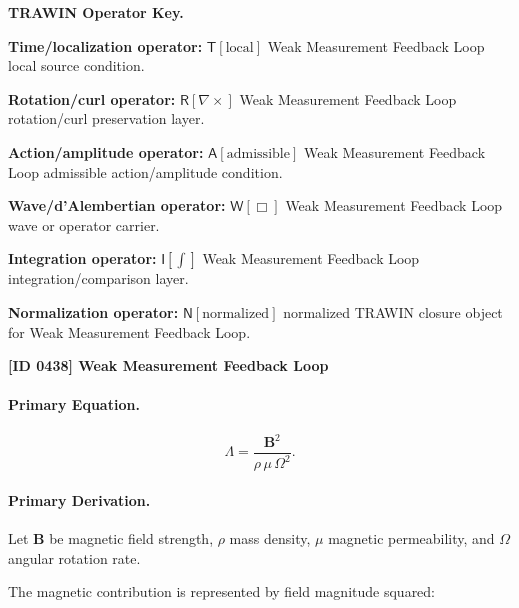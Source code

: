\par\vspace{0.45\baselineskip}
\noindent\begin{minipage}[t]{\linewidth}
\begingroup
\small
\raggedright
\textbf{TRAWIN Operator Key.}\par
\noindent\textbf{Time/localization operator:} $\mathsf{T}\!\left[\mathrm{local}\right]$ Weak Measurement Feedback Loop local source condition.\par
\noindent\textbf{Rotation/curl operator:} $\mathsf{R}\!\left[\nabla\times\right]$ Weak Measurement Feedback Loop rotation/curl preservation layer.\par
\noindent\textbf{Action/amplitude operator:} $\mathsf{A}\!\left[\mathrm{admissible}\right]$ Weak Measurement Feedback Loop admissible action/amplitude condition.\par
\noindent\textbf{Wave/d'Alembertian operator:} $\mathsf{W}\!\left[\Box\right]$ Weak Measurement Feedback Loop wave or operator carrier.\par
\noindent\textbf{Integration operator:} $\mathsf{I}\!\left[\int\right]$ Weak Measurement Feedback Loop integration/comparison layer.\par
\noindent\textbf{Normalization operator:} $\mathsf{N}\!\left[\mathrm{normalized}\right]$ normalized TRAWIN closure object for Weak Measurement Feedback Loop.\par
\endgroup
\end{minipage}

\clearpage
\noindent\textbf{[ID 0438] Weak Measurement Feedback Loop}\par
\vspace{0.35em}
\paragraph{Primary Equation.}
\begin{equation}
\Lambda
=
\frac{\mathbf{B}^2}
{\rho\,\mu\,\Omega^2}.
\end{equation}

\paragraph{Primary Derivation.}
Let $\mathbf{B}$ be magnetic field strength, $\rho$ mass density, $\mu$ magnetic permeability, and $\Omega$ angular rotation rate.

The magnetic contribution is represented by field magnitude squared:


